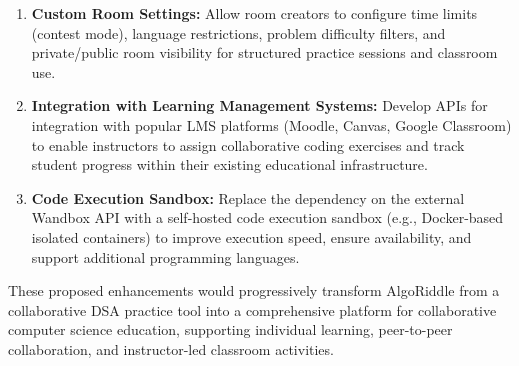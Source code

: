 \begin{enumerate}[label=\arabic*.]
    \item \textbf{Custom Room Settings:} Allow room creators to configure time limits (contest mode), language restrictions, problem difficulty filters, and private/public room visibility for structured practice sessions and classroom use.
    \item \textbf{Integration with Learning Management Systems:} Develop APIs for integration with popular LMS platforms (Moodle, Canvas, Google Classroom) to enable instructors to assign collaborative coding exercises and track student progress within their existing educational infrastructure.
    \item \textbf{Code Execution Sandbox:} Replace the dependency on the external Wandbox API with a self-hosted code execution sandbox (e.g., Docker-based isolated containers) to improve execution speed, ensure availability, and support additional programming languages.
\end{enumerate}

These proposed enhancements would progressively transform AlgoRiddle from a collaborative DSA practice tool into a comprehensive platform for collaborative computer science education, supporting individual learning, peer-to-peer collaboration, and instructor-led classroom activities.
